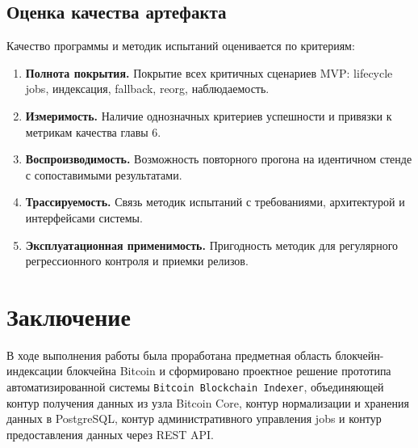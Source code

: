 ﻿\documentclass[14pt,a4paper]{extarticle}
\begin{document}
\subsection{Оценка качества артефакта}
\noindent Качество программы и методик испытаний оценивается по критериям:
\begin{enumerate}
  \item \textbf{Полнота покрытия.} Покрытие всех критичных сценариев MVP: lifecycle jobs, индексация, fallback, reorg, наблюдаемость.
  \item \textbf{Измеримость.} Наличие однозначных критериев успешности и привязки к метрикам качества главы 6.
  \item \textbf{Воспроизводимость.} Возможность повторного прогона на идентичном стенде с сопоставимыми результатами.
  \item \textbf{Трассируемость.} Связь методик испытаний с требованиями, архитектурой и интерфейсами системы.
  \item \textbf{Эксплуатационная применимость.} Пригодность методик для регулярного регрессионного контроля и приемки релизов.
\end{enumerate}

\newpage

\section*{Заключение}
\noindent В ходе выполнения работы была проработана предметная область блокчейн-индексации блокчейна Bitcoin и сформировано проектное решение прототипа автоматизированной системы \texttt{Bitcoin Blockchain Indexer}, объединяющей контур получения данных из узла Bitcoin Core, контур нормализации и хранения данных в PostgreSQL, контур административного управления jobs и контур предоставления данных через REST API.
\end{document}
